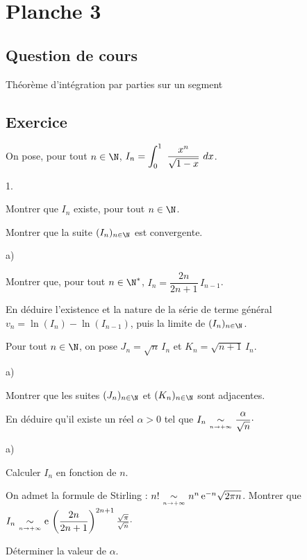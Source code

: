 \documentclass[11pt]{article}%
\begin{document}
\newpage


\section*{Planche 3}

\subsection*{Question de cours}

\noindent
Théorème d'intégration par parties sur un segment


\subsection*{Exercice}

\noindent
On pose, pour tout $n\in\N$, 
$I_n=\displaystyle \int_{0}^{1}\ \dfrac{x^n}{\sqrt{1-x}}\ dx$.\\
\begin{noliste}{1.}
\item Montrer que $I_n$ existe, pour tout $n\in\N$.
\item Montrer que la suite $(I_n)_{n\in\N}$ est convergente.
\item \begin{noliste}{a)}
	\item Montrer que, pour tout $n\in\N^*$, 
$I_n=\dfrac{2n}{2n+1}\,I_{n-1}$.
	\item En déduire l'existence et la nature de la série de terme 
général $v_n=\ln(I_n)-\ln(I_{n-1})$, puis la limite de $(I_n)_{n\in\N}$.
	\end{noliste}
\item Pour tout $n\in\N$, on pose $J_n=\sqrt{n}\,I_n$ et 
$K_n=\sqrt{n+1}\,I_n$.
	\begin{noliste}{a)}
	\item Montrer que les suites $(J_n)_{n\in\N}$ et 
$(K_n)_{n\in\N}$ sont adjacentes.
	\item En déduire qu'il existe un réel $\alpha>0$ tel que 
$I_n{\ \underset {{\overset {n \to +\infty}{}}}{\sim}\ } \dfrac{\alpha}{\sqrt{n}}\cdot$
	\end{noliste}
\item \begin{noliste}{a)}
	\item Calculer $I_n$ en fonction de $n$.
	\item On admet la formule de Stirling : $n!
{\ \underset {{\overset {n \to +\infty}{}}}{\sim}\ } n^n\,\text{e}^{-n}\sqrt{2\pi n}$. Montrer que 
$I_n{\ \underset {{\overset {n \to +\infty}{}}}{\sim}\ } \text{e} \,\left(\dfrac{2n}{2n+1}
\right)^{2n+1}\frac{\sqrt{\pi}}{\sqrt{n}}\cdot$
	\item Déterminer la valeur de $\alpha$.
\end{noliste}
\end{noliste}
\end{document}
